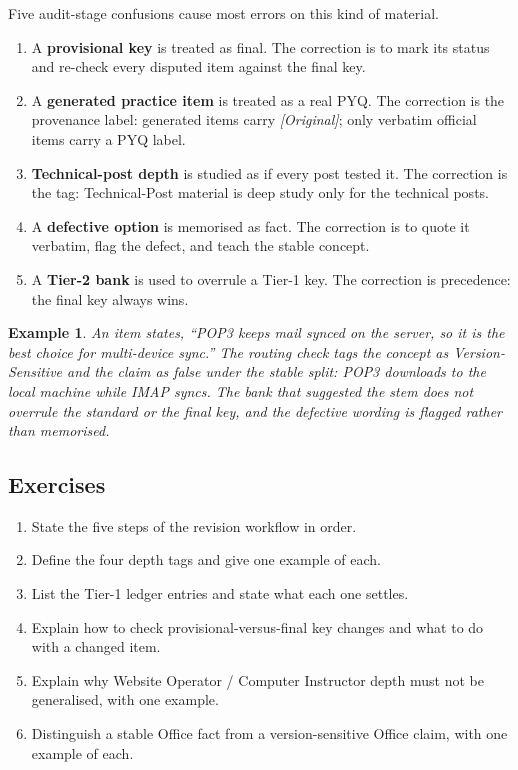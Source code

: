 \documentclass[11pt]{article}
\newtheorem{example}{Example}[section]
\begin{document}
Five audit-stage confusions cause most errors on this kind of material.
\begin{enumerate}
  \item A \textbf{provisional key} is treated as final. The correction is to
    mark its status and re-check every disputed item against the final key.
  \item A \textbf{generated practice item} is treated as a real PYQ. The
    correction is the provenance label: generated items carry
    \textit{[Original]}; only verbatim official items carry a PYQ label.
  \item \textbf{Technical-post depth} is studied as if every post tested it.
    The correction is the tag: Technical-Post material is deep study only for
    the technical posts.
  \item A \textbf{defective option} is memorised as fact. The correction is to
    quote it verbatim, flag the defect, and teach the stable concept.
  \item A \textbf{Tier-2 bank} is used to overrule a Tier-1 key. The
    correction is precedence: the final key always wins.
\end{enumerate}

\begin{example}
An item states, ``POP3 keeps mail synced on the server, so it is the best
choice for multi-device sync.'' The routing check tags the concept as
Version-Sensitive and the claim as false under the stable split: POP3
downloads to the local machine while IMAP syncs. The bank that suggested the
stem does not overrule the standard or the final key, and the defective
wording is flagged rather than memorised.
\end{example}

\subsection*{Exercises}
\begin{enumerate}[label=\arabic*.]
  \item State the five steps of the revision workflow in order.
  \item Define the four depth tags and give one example of each.
  \item List the Tier-1 ledger entries and state what each one settles.
  \item Explain how to check provisional-versus-final key changes and what to do with a changed item.
  \item Explain why Website Operator / Computer Instructor depth must not be generalised, with one example.
  \item Distinguish a stable Office fact from a version-sensitive Office claim, with one example of each.
\end{enumerate}
\end{document}
